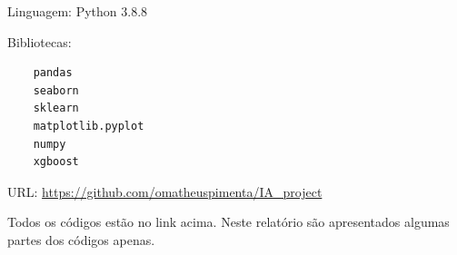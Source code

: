 \documentclass[
	article,			%
	11pt,				%
	oneside,			%
	a4paper,			%
	english,			%
	brazil,				%
	sumario=tradicional
	]{abntex2}
\begin{document}

\frenchspacing 


%
%

\maketitle





\begin{resumoumacoluna}
 Linguagem: Python $3.8.8$
 
 Bibliotecas:
 \begin{verbatim}
    pandas
    seaborn
    sklearn
    matplotlib.pyplot
    numpy
    xgboost
 \end{verbatim}

 URL: \url{https://github.com/omatheuspimenta/IA_project}
 
 Todos os códigos estão no link acima. Neste relatório são apresentados algumas partes dos códigos apenas.
 
\end{resumoumacoluna}


% 
%  

\end{document}
